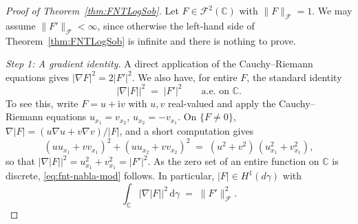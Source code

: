 \documentclass[11pt]{amsart}
\theoremstyle{remark}
\newcommand{\C}{\mathbb{C}}
\newcommand{\abs}[1]{\lvert #1 \rvert}
\newcommand{\norm}[1]{\lVert #1 \rVert}
\newcommand{\dd}{\mathrm{d}}
\newcommand{\ii}{\mathrm{i}}
\begin{document}
\begin{proof}[Proof of Theorem~\ref{thm:FNTLogSob}]
Let $F \in \mathcal{F}^2(\C)$ with $\norm{F}_{\mathcal{F}} = 1$.
We may assume $\norm{F'}_{\mathcal{F}} < \infty$, since otherwise the
left-hand side of Theorem~\ref{thm:FNTLogSob} is infinite and there is nothing
to prove.
\medskip

\noindent
\emph{Step 1: A gradient identity.}\;
A direct application of the Cauchy--Riemann equations
gives $\abs{\nabla F}^2 = 2 \abs{F'}^2$.  We also have, for
entire $F$, the standard identity
\begin{equation}\label{eq:fnt-nabla-mod}
\abs{\nabla \abs{F}}^2
\;=\; \abs{F'}^2 \qquad \text{a.e. on } \C.
\end{equation}
To see this,  write $F = u + \ii v$ with $u, v$ real-valued and apply the Cauchy--Riemann
equations $u_{x_1} = v_{x_2}$, $u_{x_2} = -v_{x_1}$.  On $\{F \neq 0\}$,
$\nabla \abs{F} = (u \nabla u + v \nabla v) / \abs{F}$, and a
short computation gives
\[
(u u_{x_1} + v v_{x_1})^2
+ (u u_{x_2} + v v_{x_2})^2
\;=\; (u^2 + v^2)\, (u_{x_1}^2 + v_{x_1}^2),
\]
so that
$\abs{\nabla \abs{F}}^2
= u_{x_1}^2 + v_{x_1}^2 = \abs{F'}^2$.
As the zero set of an entire function on $\mathbb{C}$ is discrete, \eqref{eq:fnt-nabla-mod} follows. In particular,
$\abs{F} \in H^1(d\gamma)$ with
\begin{equation}\label{eq:fnt-mod-energy}
\int_{\C} \abs{\nabla \abs{F}}^2\, \dd\gamma
\;=\; \norm{F'}_{\mathcal{F}}^2.
\end{equation}


\end{proof}
\end{document}
